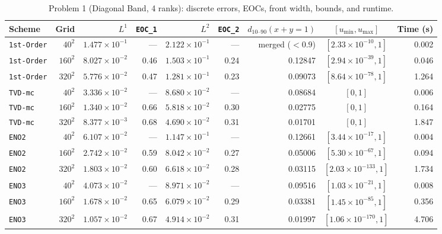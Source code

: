 \documentclass[11pt,a4paper]{article}
\theoremstyle{definition}
\newcommand{\code}[1]{\texttt{#1}}
\begin{document}
\begin{table}[h]
\centering\scriptsize\setlength{\tabcolsep}{4pt}
\caption{Problem 1 (Diagonal Band, 4 ranks): discrete errors, EOCs, front width, bounds, and runtime.}
\label{tab:p1}
\begin{tabular}{@{}lrrrrrrcr@{}}
\toprule
\textbf{Scheme} & \textbf{Grid} & $L^1$ & \code{EOC\_1} & $L^2$ & \code{EOC\_2} & $d_{10\text{--}90}(x+y=1)$ & $[u_{\min}, u_{\max}]$ & \textbf{Time (s)} \\
\midrule
\code{1st-Order} & $40^2$  & $1.477\times 10^{-1}$ & ---  & $2.122\times 10^{-1}$ & ---  & merged ($<0.9$) & $[2.33\times 10^{-10}, 1]$ & 0.002 \\
\code{1st-Order} & $160^2$ & $8.027\times 10^{-2}$ & 0.46 & $1.503\times 10^{-1}$ & 0.24 & 0.12847 & $[2.94\times 10^{-39}, 1]$ & 0.046 \\
\code{1st-Order} & $320^2$ & $5.776\times 10^{-2}$ & 0.47 & $1.281\times 10^{-1}$ & 0.23 & 0.09073 & $[8.64\times 10^{-78}, 1]$ & 1.264 \\
\midrule
\code{TVD-mc}    & $40^2$  & $3.336\times 10^{-2}$ & ---  & $8.680\times 10^{-2}$ & ---  & 0.08684 & $[0, 1]$ & 0.006 \\
\code{TVD-mc}    & $160^2$ & $1.340\times 10^{-2}$ & 0.66 & $5.818\times 10^{-2}$ & 0.30 & 0.02775 & $[0, 1]$ & 0.164 \\
\code{TVD-mc}    & $320^2$ & $8.377\times 10^{-3}$ & 0.68 & $4.690\times 10^{-2}$ & 0.31 & 0.01701 & $[0, 1]$ & 1.847 \\
\midrule
\code{ENO2}      & $40^2$  & $6.107\times 10^{-2}$ & ---  & $1.147\times 10^{-1}$ & ---  & 0.12661 & $[3.44\times 10^{-17}, 1]$ & 0.004 \\
\code{ENO2}      & $160^2$ & $2.742\times 10^{-2}$ & 0.59 & $8.042\times 10^{-2}$ & 0.27 & 0.05006 & $[5.30\times 10^{-67}, 1]$ & 0.094 \\
\code{ENO2}      & $320^2$ & $1.803\times 10^{-2}$ & 0.60 & $6.618\times 10^{-2}$ & 0.28 & 0.03115 & $[2.03\times 10^{-133}, 1]$ & 1.734 \\
\midrule
\code{ENO3}      & $40^2$  & $4.073\times 10^{-2}$ & ---  & $8.971\times 10^{-2}$ & ---  & 0.09516 & $[1.03\times 10^{-21}, 1]$ & 0.008 \\
\code{ENO3}      & $160^2$ & $1.678\times 10^{-2}$ & 0.65 & $6.079\times 10^{-2}$ & 0.29 & 0.03381 & $[1.45\times 10^{-85}, 1]$ & 0.356 \\
\code{ENO3}      & $320^2$ & $1.057\times 10^{-2}$ & 0.67 & $4.914\times 10^{-2}$ & 0.31 & 0.01997 & $[1.06\times 10^{-170}, 1]$ & 4.706 \\

\end{tabular}
\end{table}
\end{document}
